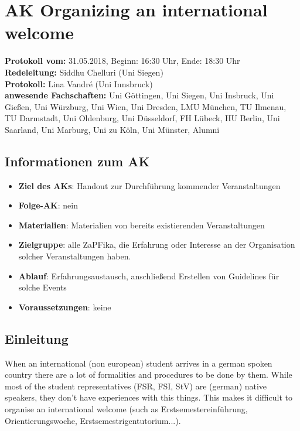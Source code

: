 
\section{AK Organizing an international welcome}

  \textbf{Protokoll vom:} 31.05.2018, %
  Beginn: 16:30 Uhr, %
  Ende: 18:30 Uhr \\ %
  \textbf{Redeleitung:} Siddhu Chelluri (Uni Siegen) \\
  \textbf{Protokoll:} Lina Vandré (Uni Innsbruck) \\
  \textbf{anwesende Fachschaften:} Uni Göttingen, Uni Siegen, Uni Insbruck, Uni Gießen, Uni Würzburg, Uni Wien, Uni Dresden, LMU München, TU Ilmenau, TU Darmstadt, Uni Oldenburg, Uni Düsseldorf, FH Lübeck, HU Berlin, Uni Saarland, Uni Marburg, Uni zu Köln, Uni Münster, Alumni

  \subsection*{Informationen zum AK}
    \begin{itemize}
    	\item \textbf{Ziel des AKs}: Handout zur Durchführung kommender Veranstaltungen
    	\item \textbf{Folge-AK}: nein
      \item \textbf{Materialien}: Materialien von bereits existierenden Veranstaltungen
    	\item \textbf{Zielgruppe}: alle ZaPFika, die Erfahrung oder Interesse an der Organisation solcher Veranstaltungen haben.
    	\item \textbf{Ablauf}: Erfahrungsaustausch, anschließend Erstellen von Guidelines für solche Events
    	\item \textbf{Voraussetzungen}: keine
    \end{itemize}

  \subsection{Einleitung}
    When an international (non european) student arrives in a german spoken country there are a lot of
    formalities and procedures to be done by them. While most of the student representatives (FSR, FSI, StV)
    are (german) native speakers, they don't have experiences with this things. This makes it difficult to
    organise an international welcome (such as Erstsemestereinführung, Orientierungswoche, Erstsemestrigentutorium...). \\


